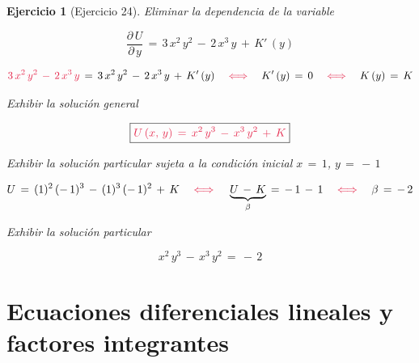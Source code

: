 \documentclass[a4paper,11pt]{book}
\newtheorem{ejer}{Ejercicio}[section]
\begin{document}
\begin{ejer}[Ejercicio 24]
 Eliminar la dependencia de la variable 

$$\dfrac{\partial\,U}{\partial\,y}\,=\,3\,x^{2}\,y^{2}\,-\,2\,x^{3}\,y\,+\,K'\,(y)$$ 

$$\textcolor{amaranth}{3\,x^{2}\,y^{2}\,-\,2\,x^{3}\,y}\,=\,3\,x^{2}\,y^{2}\,-\,2\,x^{3}\,y\,+\,K'\,(y) \quad \textcolor{amaranth}{\iff} \quad K'\,(y)\,=\,0 \quad \textcolor{amaranth}{\iff} \quad K\,(y)\,=\,K$$ 

 Exhibir la solución general 

$$\boxed{\textcolor{amaranth}{U\,(x,\,y)\,=\,x^{2}\,y^{3}\,-\,x^{3}\,y^{2}\,+\,K}} $$ 

 Exhibir la solución particular sujeta a la condición inicial $x\,=\,1$, $y\,=\,-\,1$ 

$$U\,=\,(1)^{2}\,(-\,1)^{3}\,-\,(1)^{3}\,(-\,1)^{2}\,+\,K \quad \textcolor{amaranth}{\iff} \quad \underbrace{U\,-\,K}_{\beta}\,=\,-\,1\,-\,1 \quad \textcolor{amaranth}{\iff} \quad \beta\,=\,-\,2$$ 

 Exhibir la solución particular 

$$\boxed{x^{2}\,y^{3}\,-\,x^{3}\,y^{2}\,=\,-\,2} $$ 

\end{ejer} 

\chapter{Ecuaciones diferenciales lineales y factores integrantes} 
\end{document}
